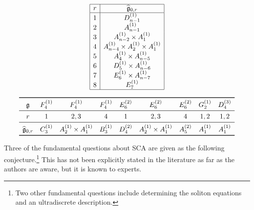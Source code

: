 \documentclass[reqno]{amsart}
\newcommand{\g}{\mathfrak{g}}
\theoremstyle{plain}
\theoremstyle{definition}
\numberwithin{equation}{section}
\begin{document}
\begin{table}
\[
\begin{array}{|c|c|}
\hline
r & \widehat{\g}_{0,r} \\\hline
1 &  D_{n-1}^{(1)} \\
2 & A_{n-1}^{(1)} \\
3 & A_{n-2}^{(1)} \times A_1^{(1)} \\
4 & A_{n-4}^{(1)} \times A_2^{(1)} \times A_1^{(1)} \\
5 & A_4^{(1)} \times A_{n-5}^{(1)} \\
6 & D_5^{(1)} \times A_{n-6}^{(1)} \\
7 & E_6^{(1)} \times A_{n-7}^{(1)} \\
8 & E_7^{(1)}
\\\hline
\end{array}
\]
\caption{The restrictions for type $E_n^{(1)}$, where we disregard any $A_k^{(1)}$ with $k \leq 0$.}
\label{table:restrictions_E}
\end{table}

\begin{table}
\[
\begin{array}{cccccccccc}
\toprule
\g & F_4^{(1)} & F_4^{(1)} & F_4^{(1)} & E_6^{(2)} & E_6^{(2)} & E_6^{(2)} & G_2^{(1)} & D_4^{(3)} \\ \midrule
r & 1 & 2,3 & 4 & 1 & 2,3 & 4 & 1,2 & 1,2 \\ \midrule
\widehat{\g}_{0,r} & C_3^{(1)} & A_2^{(1)} \times A_1^{(1)} & B_3^{(1)} & D_4^{(2)} & A_2^{(1)} \times A_1^{(1)} & A_5^{(2)} & A_1^{(1)} & A_1^{(1)} \\
\bottomrule
\end{array}
\]
\caption{The restrictions given by removing node $r$ in type $\g$ considered.}
\label{table:restrictions}
\end{table}

Three of the fundamental questions about SCA are given as the following conjecture.\footnote{Two other fundamental questions include determining the soliton equations and an ultradiscrete description.}
This has not been explicitly stated in the literature as far as the authors are aware, but it is known to experts.
\end{document}

